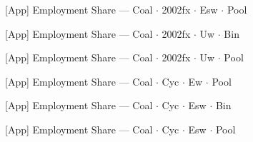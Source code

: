 \documentclass[aspectratio=169,10pt]{beamer}
\newcommand{\tabledir}{../tables/firm}
\begin{document}
\begin{frame}[t,shrink=5]{[App] Employment Share --- Coal $\cdot$ 2002fx $\cdot$ Esw $\cdot$ Pool}
\begin{center}\footnotesize

\end{center}
\end{frame}

\begin{frame}[t,shrink=5]{[App] Employment Share --- Coal $\cdot$ 2002fx $\cdot$ Uw $\cdot$ Bin}
\begin{center}\footnotesize

\end{center}
\end{frame}

\begin{frame}[t,shrink=5]{[App] Employment Share --- Coal $\cdot$ 2002fx $\cdot$ Uw $\cdot$ Pool}
\begin{center}\footnotesize

\end{center}
\end{frame}

\begin{frame}[t,shrink=5]{[App] Employment Share --- Coal $\cdot$ Cyc $\cdot$ Ew $\cdot$ Pool}
\begin{center}\footnotesize

\end{center}
\end{frame}

\begin{frame}[t,shrink=5]{[App] Employment Share --- Coal $\cdot$ Cyc $\cdot$ Esw $\cdot$ Bin}
\begin{center}\footnotesize

\end{center}
\end{frame}

\begin{frame}[t,shrink=5]{[App] Employment Share --- Coal $\cdot$ Cyc $\cdot$ Esw $\cdot$ Pool}
\begin{center}\footnotesize

\end{center}
\end{frame}
\end{document}
